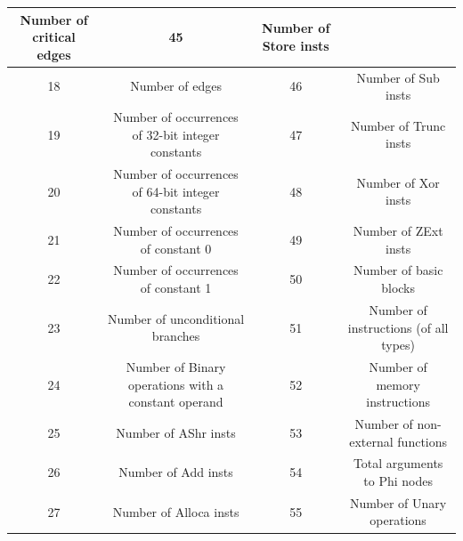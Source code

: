 \begin{table}[!t]
\begin{tabular}{
|c|c|c|c|}
Number of critical edges & 45&  Number of Store insts \\ \hline 18&
Number of edges & 46&  Number of Sub insts \\ \hline 19&
Number of occurrences of 32-bit integer constants & 47&  Number of Trunc insts \\ \hline 20&
Number of occurrences of 64-bit integer constants & 48&  Number of Xor insts \\ \hline 21&
Number of occurrences of constant 0 & 49&  Number of ZExt insts \\ \hline 22&
Number of occurrences of constant 1 & 50&  Number of basic blocks \\ \hline 23&
Number of unconditional branches & 51&  Number of instructions (of all types) \\ \hline 24&
Number of Binary operations with a constant operand & 52&  Number of memory instructions \\ \hline 25&
Number of AShr insts & 53&  Number of non-external functions \\ \hline 26&
Number of Add insts & 54&  Total arguments to Phi nodes \\ \hline 27&
Number of Alloca insts & 55&  Number of Unary operations \\ \hline
\end{tabular}
\label{tab:tab1}
\vspace{-0.1cm}
\end{table}


